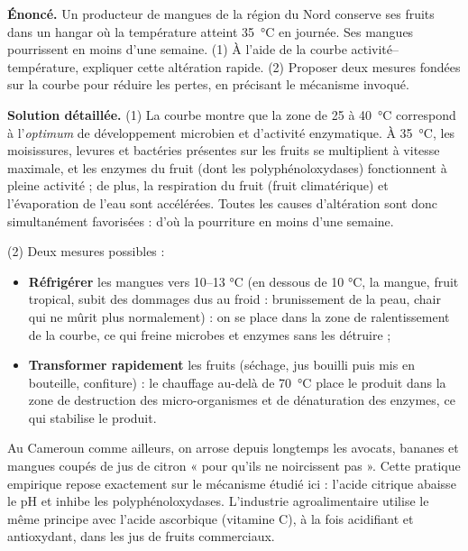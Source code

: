 \documentclass[11pt]{article}
\begin{document}
\begin{exoresolu}
\textbf{Énoncé.} Un producteur de mangues de la région du Nord conserve ses fruits dans un hangar où la température atteint \SI{35}{\celsius} en journée. Ses mangues pourrissent en moins d'une semaine. (1) À l'aide de la courbe activité--température, expliquer cette altération rapide. (2) Proposer deux mesures fondées sur la courbe pour réduire les pertes, en précisant le mécanisme invoqué.

\tcblower
\textbf{Solution détaillée.}
(1) La courbe montre que la zone de 25 à \SI{40}{\celsius} correspond à l'\emph{optimum} de développement microbien et d'activité enzymatique. À \SI{35}{\celsius}, les moisissures, levures et bactéries présentes sur les fruits se multiplient à vitesse maximale, et les enzymes du fruit (dont les polyphénoloxydases) fonctionnent à pleine activité ; de plus, la respiration du fruit (fruit climatérique) et l'évaporation de l'eau sont accélérées. Toutes les causes d'altération sont donc simultanément favorisées : d'où la pourriture en moins d'une semaine.

(2) Deux mesures possibles :
\begin{itemize}
\item \textbf{Réfrigérer} les mangues vers 10--13 \si{\celsius} (en dessous de 10 \si{\celsius}, la mangue, fruit tropical, subit des dommages dus au froid : brunissement de la peau, chair qui ne mûrit plus normalement) : on se place dans la zone de ralentissement de la courbe, ce qui freine microbes et enzymes sans les détruire ;
\item \textbf{Transformer rapidement} les fruits (séchage, jus bouilli puis mis en bouteille, confiture) : le chauffage au-delà de \SI{70}{\celsius} place le produit dans la zone de destruction des micro-organismes et de dénaturation des enzymes, ce qui stabilise le produit.
\end{itemize}
\end{exoresolu}

\begin{savaistu}
Au Cameroun comme ailleurs, on arrose depuis longtemps les avocats, bananes et mangues coupés de jus de citron « pour qu'ils ne noircissent pas ». Cette pratique empirique repose exactement sur le mécanisme étudié ici : l'acide citrique abaisse le pH et inhibe les polyphénoloxydases. L'industrie agroalimentaire utilise le même principe avec l'acide ascorbique (vitamine C), à la fois acidifiant et antioxydant, dans les jus de fruits commerciaux.
\end{savaistu}
\end{document}
